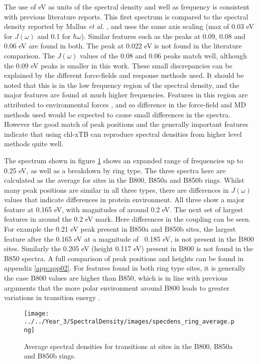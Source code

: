 The use of eV as units of the spectral density and well as frequency is consistent 
with previous literature reports. This first spectrum is compared to the spectral 
density reported by Mallus  \emph{et al.} \cite{Mallus2018}, and uses the same axis 
scaling (max of 0.03 eV for $J\left(\omega\right)$ and 0.1 for $\hbar \omega$). 
Similar features such as the peaks at 0.09, 0.08 and 0.06 eV are found in both. 
The peak at 0.022 eV is not found in the literature comparison. The $J\left(\omega\right)$ 
values of the 0.08 and 0.06 peaks match well, although the 0.09 eV peaks is smaller
in this work.
These small discrepancies can be explained by the different force-fields and response
methods used. It should be noted that this is in the low frequency region of the
spectral density, and the major features are found at much higher frequencies. Features
in this region are attributed to environmental forces \cite{Mallus2018}, and so 
difference in the force-field and MD methods used would be expected to cause small
differences in the spectra. However the good match of peak positions and the generally
important features indicate that using chl-xTB can reproduce spectral densities
from higher level methods quite well.

The spectrum shown in figure \ref{fig:specdens_sites} shows an expanded range of
frequencies up to 0.25 eV, as well as a breakdown by ring type. The three spectra
here are calculated as the average for sites in the B800, B850a and B850b rings.
Whilst many peak positions are similar in all three types, there are differences
in $J\left(\omega\right)$ values that indicate differences in protein environment.
All three show a major feature at 0.165 eV, with magnitudes of around 0.2 eV. The 
next set of largest features in around the 0.2 eV mark. Here differences in the
coupling can be seen. For example the 0.21 eV peak present in B850a and B850b sites,
the largest feature after the 0.165 eV at a magnitude of ~0.185 eV, is not present
in the B800 sites. Similarly the 0.205 eV (height 0.117 eV) present in B800 is not
found in the B850 spectra. A full comparison of peak positions and heights can be
found in appendix \ref{app:app02}. For features found in both ring type sites, it
is generally the case B800 values are higher than B850, which is in line with previous
arguments that the more polar environment around B800 leads to greater variations 
in transition energy \cite{Olbrich2010}.

\begin{figure}
    \centering
    \texttt{[image: ../../Year\_3/SpectralDensity/images/specdens\_ring\_average.png]}
    \caption{Average spectral densities for \Qy transitions at sites in the B800,
    B850a and B850b rings.}
    \label{fig:specdens_sites}
\end{figure}

